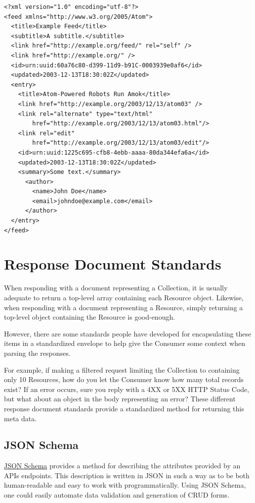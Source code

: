 \documentclass{book}
\begin{document}
\begin{verbatim}
<?xml version="1.0" encoding="utf-8"?>
<feed xmlns="http://www.w3.org/2005/Atom">
  <title>Example Feed</title>
  <subtitle>A subtitle.</subtitle>
  <link href="http://example.org/feed/" rel="self" />
  <link href="http://example.org/" />
  <id>urn:uuid:60a76c80-d399-11d9-b91C-0003939e0af6</id>
  <updated>2003-12-13T18:30:02Z</updated>
  <entry>
    <title>Atom-Powered Robots Run Amok</title>
    <link href="http://example.org/2003/12/13/atom03" />
    <link rel="alternate" type="text/html"
        href="http://example.org/2003/12/13/atom03.html"/>
    <link rel="edit"
        href="http://example.org/2003/12/13/atom03/edit"/>
    <id>urn:uuid:1225c695-cfb8-4ebb-aaaa-80da344efa6a</id>
    <updated>2003-12-13T18:30:02Z</updated>
    <summary>Some text.</summary>
      <author>
        <name>John Doe</name>
        <email>johndoe@example.com</email>
      </author>
  </entry>
</feed>
\end{verbatim}


\section{Response Document Standards}

When responding with a document representing a Collection, it is usually adequate to return a top-level array containing each Resource object. Likewise, when responding with a document representing a Resource, simply returning a top-level object containing the Resource is good-enough.

However, there are some standards people have developed for encapsulating these items in a standardized envelope to help give the Consumer some context when parsing the responses.

For example, if making a filtered request limiting the Collection to containing only 10 Resources, how do you let the Consumer know how many total records exist? If an error occurs, sure you reply with a 4XX or 5XX HTTP Status Code, but what about an object in the body representing an error? These different response document standards provide a standardized method for returning this meta data.

\subsection{JSON Schema}

\href{http://json-schema.org/}{JSON Schema} provides a method for describing the attributes provided by an APIs endpoints. This description is written in JSON in such a way as to be both human-readable and easy to work with programmatically. Using JSON Schema, one could easily automate data validation and generation of CRUD forms.
\end{document}
